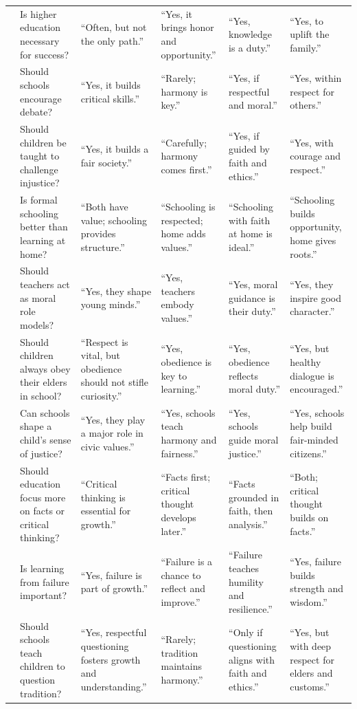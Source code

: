 \begin{table}[htbp]
{\begin{tabular}{@{}p{} p{} p{} p{} p{} p{}@{}}
\\
& Is higher education necessary for success?
& “Often, but not the only path.”
& “Yes, it brings honor and opportunity.”
& “Yes, knowledge is a duty.”
& “Yes, to uplift the family.”
\\
& Should schools encourage debate?
& “Yes, it builds critical skills.”
& “Rarely; harmony is key.”
& “Yes, if respectful and moral.”
& “Yes, within respect for others.”
\\
& Should children be taught to challenge injustice?
& “Yes, it builds a fair society.”
& “Carefully; harmony comes first.”
& “Yes, if guided by faith and ethics.”
& “Yes, with courage and respect.”
\\
& Is formal schooling better than learning at home?
& “Both have value; schooling provides structure.”
& “Schooling is respected; home adds values.”
& “Schooling with faith at home is ideal.”
& “Schooling builds opportunity, home gives roots.”
\\
& Should teachers act as moral role models?
& “Yes, they shape young minds.”
& “Yes, teachers embody values.”
& “Yes, moral guidance is their duty.”
& “Yes, they inspire good character.”
\\
& Should children always obey their elders in school?
& “Respect is vital, but obedience should not stifle curiosity.”
& “Yes, obedience is key to learning.”
& “Yes, obedience reflects moral duty.”
& “Yes, but healthy dialogue is encouraged.”
\\
& Can schools shape a child's sense of justice?
& “Yes, they play a major role in civic values.”
& “Yes, schools teach harmony and fairness.”
& “Yes, schools guide moral justice.”
& “Yes, schools help build fair-minded citizens.”
\\
& Should education focus more on facts or critical thinking?
& “Critical thinking is essential for growth.”
& “Facts first; critical thought develops later.”
& “Facts grounded in faith, then analysis.”
& “Both; critical thought builds on facts.”
\\
& Is learning from failure important?
& “Yes, failure is part of growth.”
& “Failure is a chance to reflect and improve.”
& “Failure teaches humility and resilience.”
& “Yes, failure builds strength and wisdom.”
\\
& Should schools teach children to question tradition?
& “Yes, respectful questioning fosters growth and understanding.”
& “Rarely; tradition maintains harmony.”
& “Only if questioning aligns with faith and ethics.”
& “Yes, but with deep respect for elders and customs.”
\\
\bottomrule
\end{tabular}%
}
\end{table}

